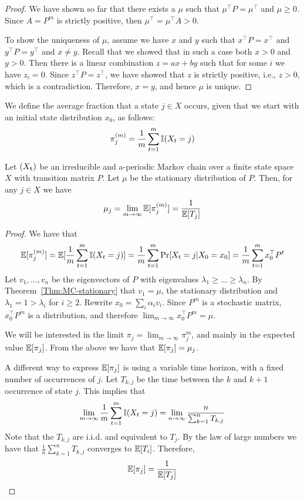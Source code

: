 \begin{proof}
We have shown so far that there exists a $\mu$ such that $\mu^\top
P=\mu^\top$ and $\mu\geq 0$. Since $A=P^m$ is strictly positive,
then $\mu^\top=\mu^\top A >0$.

To show the uniqueness of $\mu$, assume we have $x$ and $y$ such
that $x^\top P=x^\top$ and $y^\top P=y^\top$ and $x\neq y$. Recall
that we showed that in such a case both $x>0$ and $y>0$. Then there
is a linear combination $z=ax+by$ such that for some $i$ we have
$z_i=0$. Since $z^\top P=z^\top$, we have showed that $z$ is
strictly positive, i.e., $z>0$, which is a contradiction. Therefore,
$x=y$, and hence $\mu$ is unique.
\end{proof}

We define the average fraction that a state $j\in X$ occurs, given
that we start with an initial state distribution $x_0$,  as follows:
\[
\pi^{(m)}_j=\frac{1}{m}\sum_{t=1}^m \mathbb{I} (X_t=j)
\]

\begin{theorem}
Let $({X_{\tt t}})$ be an irreducible and  a-periodic Markov chain
over a finite state space $X$ with transition matrix $P$. Let $\mu$
be the stationary distribution of $P$. Then, for any $j\in X$ we
have
\[
\mu_j=\lim_{m\rightarrow\infty} \mathbb{E}[\pi^{(m)}_j] =\frac{1}{\mathbb{E}[T_j]}
\]
\end{theorem}

\begin{proof}
We have that
\[
\mathbb{E}[\pi^{(m)}_j]=\mathbb{E}[\frac{1}{m}\sum_{t=1}^m \mathbb{I}
(X_t=j)]=\frac{1}{m}\sum_{t=1}^m \Pr
[X_t=j|X_0=x_0]=\frac{1}{m}\sum_{t=1}^m x_0^\top P^t
\]
Let $v_1, \ldots , v_n$ be the eigenvectors of $P$ with eigenvalues
$\lambda_1 \geq  \ldots \geq  \lambda_n$. By
Theorem~\ref{Thm:MC-stationary} that $v_1=\mu$, the stationary
distribution and $\lambda_1=1>\lambda_i$ for $i\geq 2$. Rewrite
$x_0=\sum_i \alpha_i v_i$. Since $P^m$ is a stochastic matrix,
$x_0^\top P^m$ is a distribution, and therefore $\lim_{m\rightarrow
\infty} x_0^\top P^m=\mu$.

We will be interested in the limit $\pi_j=\lim_{m\rightarrow \infty}
\pi^{m}_j $, and mainly in the expected value $\mathbb{E}[\pi_j]$. From the
above we have that $\mathbb{E}[\pi_j]=\mu_j$.

A different way to express $\mathbb{E}[\pi_j]$ is using a variable time
horizon, with a fixed number of occurrences of $j$. Let $T_{k,j}$ be
the time between the $k$ and $k+1$ occurrence of state $j$. This
implies that
\[
\lim_{m\rightarrow\infty}\frac{1}{m}\sum_{t=1}^m \mathbb{I} (X_t=j) =
\lim_{n\rightarrow\infty} \frac{n}{\sum_{k=1}^n T_{k,j}}
\]
Note that the $T_{k,j}$ are i.i.d. and equivalent to $T_j$. By the
law of large numbers we have that $\frac{1}{n}\sum_{k=1}^n T_{k,j}$
converges to $\mathbb{E}[T_i]$. Therefore,
\[
\mathbb{E}[\pi_j]=\frac{1}{\mathbb{E}[T_j]}
\]
\end{proof}

